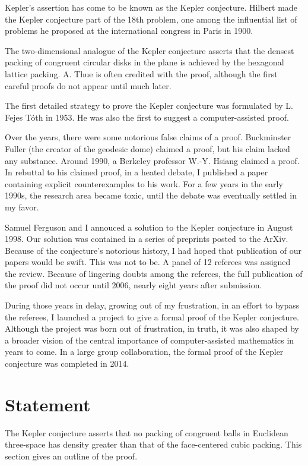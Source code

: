 \documentclass{amsart}
\begin{document}
Kepler's assertion has come to be known as the Kepler conjecture.
Hilbert made the Kepler conjecture part of the 18th problem, one among
the influential list of problems he proposed at the international
congress in Paris in 1900.

The two-dimensional analogue of the Kepler conjecture asserts that the
densest packing of congruent circular disks in the plane is achieved
by the hexagonal lattice packing.  A. Thue is often credited with the
proof, although the first careful proofs do not appear until much
later.

The first detailed strategy to prove the Kepler conjecture was
formulated by L. Fejes T\'oth in 1953.  He was also the first to
suggest a computer-assisted proof.

Over the years, there were some notorious false claims of a proof.
Buckminster Fuller (the creator of the geodesic dome) claimed a proof,
but his claim lacked any substance.  Around 1990, a Berkeley professor
W.-Y. Hsiang claimed a proof.  In rebuttal to his claimed proof, in a
heated debate, I published a paper containing explicit counterexamples
to his work.  For a few years in the early 1990s, the research area
became toxic, until the debate was eventually settled in my favor.

Samuel Ferguson and I annouced a solution to the Kepler conjecture in
August 1998.  Our solution was contained in a series of preprints
posted to the ArXiv.  Because of the conjecture's notorious history, I
had hoped that publication of our papers would be swift. This was not
to be.  A panel of 12 referees was assigned the review.  Because of
lingering doubts among the referees, the full publication of the proof
did not occur until 2006, nearly eight years after submission.

During those years in delay, growing out of my frustration, in an
effort to bypass the referees, I launched a project to give a formal
proof of the Kepler conjecture.  Although the project was born out of
frustration, in truth, it was also
shaped by a broader vision of the central importance of
computer-assisted mathematics in years to come.  In a large group
collaboration, the formal proof of the Kepler conjecture was completed
in 2014.

\section{Statement}

The Kepler conjecture asserts that no packing of congruent balls in
Euclidean three-space has density greater than that of the
face-centered cubic packing.  This section gives an outline of the
proof.
\end{document}
